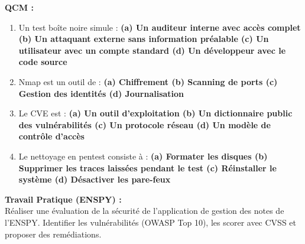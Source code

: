 \begin{boxexo}
\textbf{QCM :}
\begin{enumerate}
    \item Un test boîte noire simule : \textbf{(a) Un auditeur interne avec accès complet \quad (b) Un attaquant externe sans information préalable \quad (c) Un utilisateur avec un compte standard \quad (d) Un développeur avec le code source}
    \item Nmap est un outil de : \textbf{(a) Chiffrement \quad (b) Scanning de ports \quad (c) Gestion des identités \quad (d) Journalisation}
    \item Le CVE est : \textbf{(a) Un outil d'exploitation \quad (b) Un dictionnaire public des vulnérabilités \quad (c) Un protocole réseau \quad (d) Un modèle de contrôle d'accès}
    \item Le nettoyage en pentest consiste à : \textbf{(a) Formater les disques \quad (b) Supprimer les traces laissées pendant le test \quad (c) Réinstaller le système \quad (d) Désactiver les pare-feux}
\end{enumerate}

\textbf{Travail Pratique (ENSPY) :}\\
Réaliser une évaluation de la sécurité de l'application de gestion des notes de l'ENSPY. Identifier les vulnérabilités (OWASP Top 10), les scorer avec CVSS et proposer des remédiations.
\end{boxexo}
